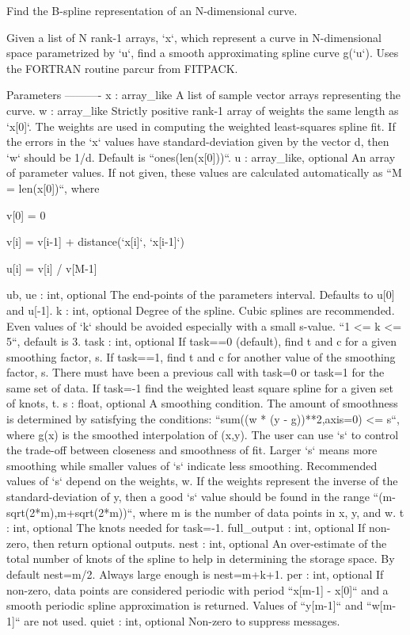 \begin{DoxyVerb}Find the B-spline representation of an N-dimensional curve.

Given a list of N rank-1 arrays, `x`, which represent a curve in
N-dimensional space parametrized by `u`, find a smooth approximating
spline curve g(`u`). Uses the FORTRAN routine parcur from FITPACK.

Parameters
----------
x : array_like
    A list of sample vector arrays representing the curve.
w : array_like
    Strictly positive rank-1 array of weights the same length as `x[0]`.
    The weights are used in computing the weighted least-squares spline
    fit. If the errors in the `x` values have standard-deviation given by
    the vector d, then `w` should be 1/d. Default is ``ones(len(x[0]))``.
u : array_like, optional
    An array of parameter values. If not given, these values are
    calculated automatically as ``M = len(x[0])``, where

        v[0] = 0

        v[i] = v[i-1] + distance(`x[i]`, `x[i-1]`)

        u[i] = v[i] / v[M-1]

ub, ue : int, optional
    The end-points of the parameters interval.  Defaults to
    u[0] and u[-1].
k : int, optional
    Degree of the spline. Cubic splines are recommended.
    Even values of `k` should be avoided especially with a small s-value.
    ``1 <= k <= 5``, default is 3.
task : int, optional
    If task==0 (default), find t and c for a given smoothing factor, s.
    If task==1, find t and c for another value of the smoothing factor, s.
    There must have been a previous call with task=0 or task=1
    for the same set of data.
    If task=-1 find the weighted least square spline for a given set of
    knots, t.
s : float, optional
    A smoothing condition.  The amount of smoothness is determined by
    satisfying the conditions: ``sum((w * (y - g))**2,axis=0) <= s``,
    where g(x) is the smoothed interpolation of (x,y).  The user can
    use `s` to control the trade-off between closeness and smoothness
    of fit.  Larger `s` means more smoothing while smaller values of `s`
    indicate less smoothing. Recommended values of `s` depend on the
    weights, w.  If the weights represent the inverse of the
    standard-deviation of y, then a good `s` value should be found in
    the range ``(m-sqrt(2*m),m+sqrt(2*m))``, where m is the number of
    data points in x, y, and w.
t : int, optional
    The knots needed for task=-1.
full_output : int, optional
    If non-zero, then return optional outputs.
nest : int, optional
    An over-estimate of the total number of knots of the spline to
    help in determining the storage space.  By default nest=m/2.
    Always large enough is nest=m+k+1.
per : int, optional
   If non-zero, data points are considered periodic with period
   ``x[m-1] - x[0]`` and a smooth periodic spline approximation is
   returned.  Values of ``y[m-1]`` and ``w[m-1]`` are not used.
quiet : int, optional
     Non-zero to suppress messages.


\end{DoxyVerb}

